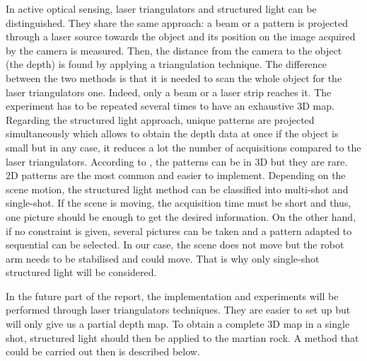 In active optical sensing, laser triangulators and structured light can be distinguished. They share the same approach: a beam or a pattern is projected through a laser source towards the object and its position on the image acquired by the camera is measured. Then, the distance from the camera to the object (the depth) is found by applying a triangulation technique. The difference between the two methods is that it is needed to scan the whole object for the laser triangulators one. Indeed, only a beam or a laser strip reaches it. The experiment has to be repeated several times to have an exhaustive 3D map. Regarding the structured light approach, unique patterns are projected simultaneously which allows to obtain the depth data at once if the object is small but in any case, it reduces a lot the number of acquisitions compared to the laser triangulators. According to \cite{tuto}, the patterns can be in 3D but they are rare. 2D patterns are the most common and easier to implement. Depending on the scene motion, the structured light method can be classified into multi-shot and single-shot. If the scene is moving, the acquisition time must be short and thus, one picture should be enough to get the desired information. On the other hand, if no constraint is given, several pictures can be taken and a pattern adapted to sequential can be selected. In our case, the scene does not move but the robot arm needs to be stabilised and could move. That is why only single-shot structured light will be considered.

In the future part of the report, the implementation and experiments will be performed through laser triangulators techniques. They are easier to set up but will only give us a partial depth map. To obtain a complete 3D map in a single shot, structured light should then be applied to the martian rock. A method that could be carried out then is described below. 